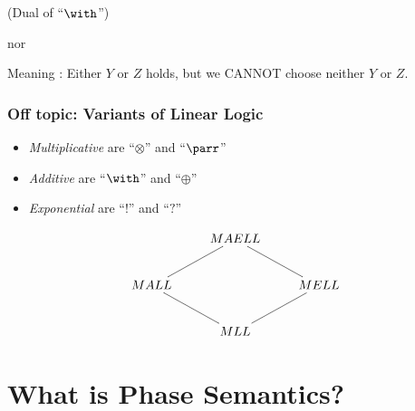 \documentclass[dvipdfmx,cjk]{beamer}
\theoremstyle{example}
\begin{document}
\begin{frame}
  \oplus (Dual of ``$\with$'')
  
  \begin{prooftree}

    
  \end{prooftree}

  nor

  \begin{prooftree}

    
  \end{prooftree} 

  Meaning : Either $Y$ or $Z$ holds, but we CANNOT choose neither $Y$ or $Z$.

\end{frame}

\begin{frame}
  \frametitle{Off topic: Variants of Linear Logic}

  \begin{itemize}
      \item \textit{Multiplicative} are ``$\otimes$'' and ``$\parr$'' 
      \item \textit{Additive} are ``$\with$''   and ``$\oplus$''
      \item \textit{Exponential} are ``$!$'' and ``$?$''
  \end{itemize}

  \[
      \xymatrix{
        & MAELL \ar@{-}[dr] \ar@{-}[dl] \\
        MALL \ar@{-}[dr] & & MELL \ar@{-}[dl] \\
        & MLL
      }
   \]      
  
\end{frame}

                          \section{What is Phase Semantics?}
                          
\end{document}
